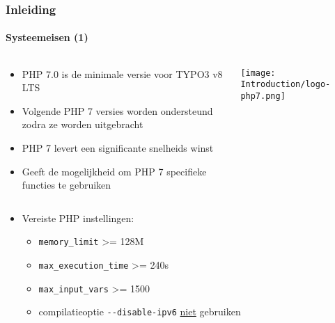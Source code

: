 \begin{frame}[fragile]
	\frametitle{Inleiding}
	\framesubtitle{Systeemeisen (1)}


	\begin{columns}[T]

		\begin{column}{.75\textwidth}
			\tabto{0.1cm}
				\begin{itemize}
					\item PHP 7.0 is de minimale versie\newline
						voor TYPO3 v8 LTS
					\item Volgende PHP 7 versies worden ondersteund zodra ze worden uitgebracht
					\item PHP 7 levert een significante snelheids winst
					\item Geeft de mogelijkheid om PHP 7 specifieke functies te gebruiken

				\end{itemize}
		\end{column}

        \begin{column}{.25\textwidth}
			\texttt{[image: Introduction/logo-php7.png]}
        \end{column}

    \end{columns}

	\begin{itemize}
		\item Vereiste PHP instellingen:

			\begin{itemize}
				\item \texttt{memory\_limit} >= 128M
				\item \texttt{max\_execution\_time} >= 240s
				\item \texttt{max\_input\_vars} >= 1500
				\item compilatieoptie \texttt{-}\texttt{-disable-ipv6} \underline{niet} gebruiken
			\end{itemize}
	\end{itemize}


\end{frame}

